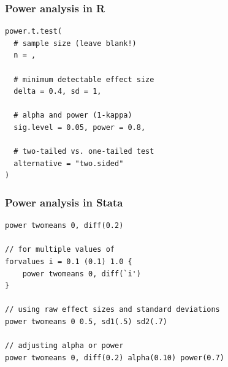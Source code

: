 \documentclass[14pt]{beamer}
\begin{document}


\begin{frame}[fragile]

\frametitle{Power analysis in R}
\small
\begin{verbatim}
power.t.test(
  # sample size (leave blank!)
  n = ,
  
  # minimum detectable effect size
  delta = 0.4, sd = 1,
  
  # alpha and power (1-kappa)
  sig.level = 0.05, power = 0.8,
  
  # two-tailed vs. one-tailed test
  alternative = "two.sided"
)
\end{verbatim}
\end{frame}


\begin{frame}[fragile]

\frametitle{Power analysis in Stata}
\small
\begin{verbatim}
power twomeans 0, diff(0.2)

// for multiple values of 
forvalues i = 0.1 (0.1) 1.0 {
    power twomeans 0, diff(`i')
}

// using raw effect sizes and standard deviations
power twomeans 0 0.5, sd1(.5) sd2(.7)

// adjusting alpha or power
power twomeans 0, diff(0.2) alpha(0.10) power(0.7)
\end{verbatim}
\end{frame}
\end{document}

